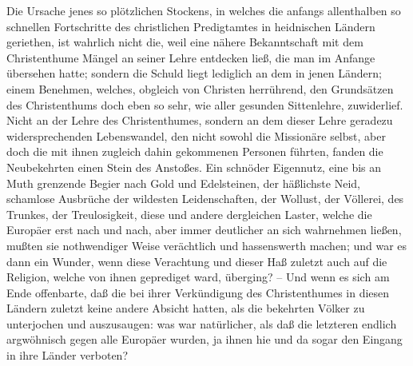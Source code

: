 \begin{aufza}
\item Die Ursache jenes so plötzlichen Stockens, in welches die anfangs allenthalben so schnellen Fortschritte des christlichen Predigtamtes in heidnischen Ländern geriethen, ist wahrlich nicht die, weil eine nähere Bekanntschaft mit dem Christenthume Mängel an seiner Lehre entdecken ließ, die man im Anfange übersehen hatte; sondern die Schuld liegt lediglich an dem  in jenen Ländern; einem Benehmen, welches, obgleich von Christen herrührend, den Grundsätzen des Christenthums doch eben so sehr, wie aller gesunden Sittenlehre, zuwiderlief. Nicht an der Lehre des Christenthumes, sondern an dem dieser Lehre geradezu widersprechenden Lebenswandel, den nicht sowohl die Missionäre selbst, aber doch die mit ihnen zugleich dahin gekommenen Personen führten, fanden die Neubekehrten einen Stein des Anstoßes. Ein schnöder Eigennutz, eine bis an Muth grenzende Begier nach Gold und Edelsteinen, der häßlichste Neid, schamlose Ausbrüche der wildesten Leidenschaften, der Wollust, der Völlerei, des Trunkes, der Treulosigkeit, diese und andere dergleichen Laster, welche die Europäer erst nach und nach, aber immer deutlicher an sich wahrnehmen ließen, mußten sie nothwendiger Weise verächtlich und hassenswerth machen; und war es dann ein Wunder, wenn diese Verachtung und dieser Haß zuletzt auch auf die Religion, welche von ihnen geprediget ward, überging? -- Und wenn es sich am Ende offenbarte, daß die  bei ihrer Verkündigung des Christenthumes in diesen Ländern zuletzt keine andere Absicht hatten, als die bekehrten Völker zu unterjochen und auszusaugen: was war natürlicher, als daß die letzteren endlich argwöhnisch gegen alle Europäer wurden, ja ihnen hie und da sogar den Eingang in ihre Länder verboten?~

\end{aufza}
